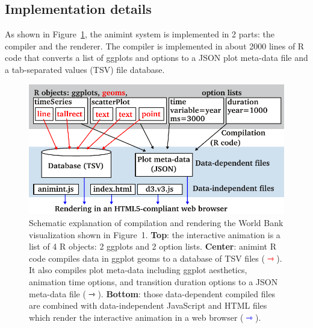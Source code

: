 \documentclass[12pt]{article}\usepackage[]{graphicx}\usepackage[]{color}
\begin{document}
\subsection{Implementation details}
\label{sec:implementation}

As shown in Figure~\ref{fig:design}, the animint system is implemented
in 2 parts: the compiler and the renderer. The compiler is implemented in about 
2000 lines of R code that converts a list of ggplots and options to a JSON 
plot meta-data file and a tab-separated values (TSV) file database.

\begin{figure}[htp]
  \centering
  \includegraphics[width=\columnwidth]{figure-design}
  \caption{Schematic explanation of compilation and rendering the
    World Bank visualization shown in Figure~1. \textbf{Top}: the
    interactive animation is a list of 4 R objects: 2 ggplots and 2
    option lists. \textbf{Center}: animint R code compiles data in
    ggplot geoms to a database of TSV files
    (\textcolor{red}{$\rightarrowtriangle$}). It also compiles plot
    meta-data including ggplot aesthetics, animation time
    options, and transition duration options to a JSON meta-data file
    ($\rightarrowtriangle$). \textbf{Bottom}: those data-dependent
    compiled files are combined with data-independent JavaScript and
    HTML files which render the interactive animation in a web browser
    (\textcolor{blue}{$\rightarrowtriangle$}).}
  \label{fig:design}
\end{figure}
\end{document}
